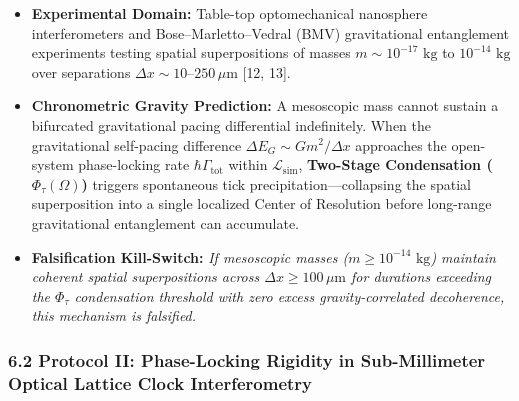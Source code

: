 \documentclass[
]{article}
\providecommand{\tightlist}{%
  \setlength{\itemsep}{0pt}\setlength{\parskip}{0pt}}
\begin{document}
\begin{itemize}
\tightlist
\item
  \textbf{Experimental Domain:} Table-top optomechanical nanosphere
  interferometers and Bose--Marletto--Vedral (BMV) gravitational
  entanglement experiments testing spatial superpositions of masses
  \(m \sim 10^{-17}\text{ kg}\) to \(10^{-14}\text{ kg}\) over
  separations \(\Delta x \sim 10\text{--}250\,\mu\text{m}\) {[}12,
  13{]}.
\item
  \textbf{Chronometric Gravity Prediction:} A mesoscopic mass cannot
  sustain a bifurcated gravitational pacing differential indefinitely.
  When the gravitational self-pacing difference
  \(\Delta E_G \sim G m^2 / \Delta x\) approaches the open-system
  phase-locking rate \(\hbar \Gamma_{\mathrm{tot}}\) within
  \(\mathcal{L}_{\mathrm{sim}}\), \textbf{Two-Stage Condensation
  (\(\Phi_\tau(\Omega)\))} triggers spontaneous tick
  precipitation---collapsing the spatial superposition into a single
  localized Center of Resolution before long-range gravitational
  entanglement can accumulate.
\item
  \textbf{Falsification Kill-Switch:} \emph{If mesoscopic masses
  (\(m \ge 10^{-14}\text{ kg}\)) maintain coherent spatial
  superpositions across \(\Delta x \ge 100\,\mu\text{m}\) for durations
  exceeding the \(\Phi_\tau\) condensation threshold with zero excess
  gravity-correlated decoherence, this mechanism is falsified.}
\end{itemize}

\subsubsection{6.2 Protocol II: Phase-Locking Rigidity in Sub-Millimeter
Optical Lattice Clock
Interferometry}\label{protocol-ii-phase-locking-rigidity-in-sub-millimeter-optical-lattice-clock-interferometry}
\end{document}
